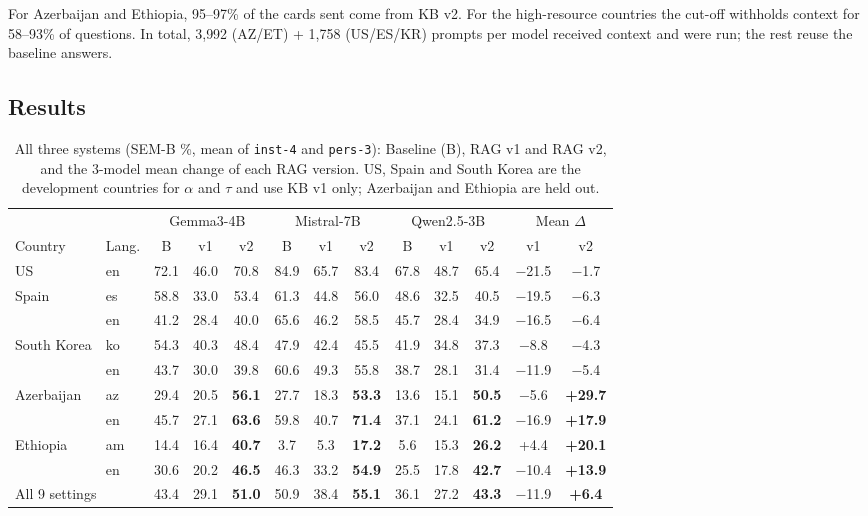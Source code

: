 \documentclass[11pt]{article}
\begin{document}
\noindent For Azerbaijan and Ethiopia, 95--97\% of the cards sent come from KB v2. For the
high-resource countries the cut-off withholds context for 58--93\% of questions. In total, 3{,}992
(AZ/ET) + 1{,}758 (US/ES/KR) prompts per model received context and were run; the rest reuse the
baseline answers.

\subsection{Results}

\begin{table}[h]
\centering
\caption{All three systems (SEM-B \%, mean of \texttt{inst-4} and \texttt{pers-3}): Baseline (B),
RAG v1 and RAG v2, and the 3-model mean change of each RAG version. US, Spain and South Korea are the
development countries for $\alpha$ and $\tau$ and use KB v1 only; Azerbaijan and Ethiopia are held out.}
\label{tab:all}
\small
\setlength{\tabcolsep}{4pt}
\begin{tabular}{ll|ccc|ccc|ccc|cc}
\toprule
 & & \multicolumn{3}{c|}{Gemma3-4B} & \multicolumn{3}{c|}{Mistral-7B} & \multicolumn{3}{c|}{Qwen2.5-3B} & \multicolumn{2}{c}{Mean $\Delta$} \\
Country & Lang. & B & v1 & v2 & B & v1 & v2 & B & v1 & v2 & v1 & v2 \\
\midrule
US          & en & 72.1 & 46.0 & 70.8 & 84.9 & 65.7 & 83.4 & 67.8 & 48.7 & 65.4 & $-$21.5 & $-$1.7 \\
Spain       & es & 58.8 & 33.0 & 53.4 & 61.3 & 44.8 & 56.0 & 48.6 & 32.5 & 40.5 & $-$19.5 & $-$6.3 \\
            & en & 41.2 & 28.4 & 40.0 & 65.6 & 46.2 & 58.5 & 45.7 & 28.4 & 34.9 & $-$16.5 & $-$6.4 \\
South Korea & ko & 54.3 & 40.3 & 48.4 & 47.9 & 42.4 & 45.5 & 41.9 & 34.8 & 37.3 & $-$8.8  & $-$4.3 \\
            & en & 43.7 & 30.0 & 39.8 & 60.6 & 49.3 & 55.8 & 38.7 & 28.1 & 31.4 & $-$11.9 & $-$5.4 \\
\midrule
Azerbaijan  & az & 29.4 & 20.5 & \textbf{56.1} & 27.7 & 18.3 & \textbf{53.3} & 13.6 & 15.1 & \textbf{50.5} & $-$5.6 & \textbf{+29.7} \\
            & en & 45.7 & 27.1 & \textbf{63.6} & 59.8 & 40.7 & \textbf{71.4} & 37.1 & 24.1 & \textbf{61.2} & $-$16.9 & \textbf{+17.9} \\
Ethiopia    & am & 14.4 & 16.4 & \textbf{40.7} & 3.7 & 5.3 & \textbf{17.2} & 5.6 & 15.3 & \textbf{26.2} & +4.4 & \textbf{+20.1} \\
            & en & 30.6 & 20.2 & \textbf{46.5} & 46.3 & 33.2 & \textbf{54.9} & 25.5 & 17.8 & \textbf{42.7} & $-$10.4 & \textbf{+13.9} \\
\midrule
\multicolumn{2}{l|}{All 9 settings} & 43.4 & 29.1 & \textbf{51.0} & 50.9 & 38.4 & \textbf{55.1} & 36.1 & 27.2 & \textbf{43.3} & $-$11.9 & \textbf{+6.4} \\
\bottomrule
\end{tabular}
\end{table}
\end{document}

